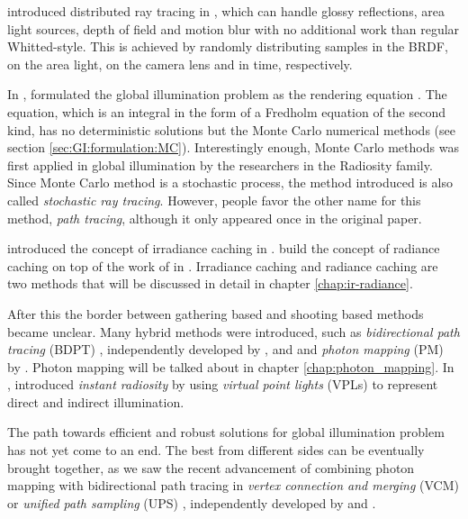 \documentclass[]{book}
\begin{document}
\citeauthor{cook1984distributed} introduced distributed ray tracing in \citeyear{cook1984distributed} \cite{cook1984distributed}, which can handle glossy reflections, area light sources, depth of field and motion blur with no additional work than regular Whitted-style.
This is achieved by randomly distributing samples in the BRDF, on the area light, on the camera lens and in time, respectively.

In \citeyear{kajiya1986rendering}, \citeauthor{kajiya1986rendering} formulated the global illumination problem as the rendering equation \cite{kajiya1986rendering}.
The equation, which is an integral in the form of a Fredholm equation of the second kind, has no deterministic solutions but the Monte Carlo numerical methods (see section \ref{sec:GI:formulation:MC}).
Interestingly enough, Monte Carlo methods was first applied in global illumination by the researchers in the Radiosity family.
Since Monte Carlo method is a stochastic process, the method \citeauthor{kajiya1986rendering} introduced is also called \textit{stochastic ray tracing}.
However, people favor the other name for this method, \textit{path tracing}, although it only appeared once in the original paper.

\citeauthor{ward1988IC} introduced the concept of irradiance caching in \citeyear{ward1988IC} \cite{ward1988IC}.
\citeauthor{krivanek2005radiance} build the concept of radiance caching \cite{krivanek2005radiance} on top of the work of \citeauthor{ward1988IC} in \citeyear{krivanek2005radiance}.
Irradiance caching and radiance caching are two methods that will be discussed in detail in chapter \ref{chap:ir-radiance}.

After this the border between gathering based and shooting based methods became unclear.
Many hybrid methods were introduced, such as \textit{bidirectional path tracing} (BDPT) \cite{lafortune1993bi, veach1995BDPT}, independently developed by \citeauthor{lafortune1993bi}, and \citeauthor{veach1995BDPT} and \textit{photon mapping} (PM) \cite{jensen1996global} by \citeauthor{jensen1996global}.
Photon mapping will be talked about in chapter \ref{chap:photon_mapping}.
In \citeyear{keller1997VPL}, \citeauthor{keller1997VPL} introduced \textit{instant radiosity} by using \textit{virtual point lights} (VPLs) to represent direct and indirect illumination.

The path towards efficient and robust solutions for global illumination problem has not yet come to an end.
The best from different sides can be eventually brought together, as we saw the recent advancement of combining photon mapping with bidirectional path tracing in \textit{vertex connection and merging} (VCM) \cite{georgiev2012light} or \textit{unified path sampling} (UPS) \cite{hachisuka2012path}, independently developed by \citeauthor{georgiev2012light} and \citeauthor{hachisuka2012path}.
\end{document}
